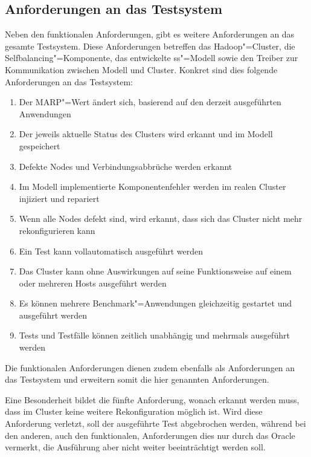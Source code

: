 \subsection{Anforderungen an das Testsystem}
\label{subsec:testRequirements}

Neben den funktionalen Anforderungen, gibt es weitere Anforderungen an das gesamte Testsystem.
Diese Anforderungen betreffen das Hadoop"=Cluster, die Selfbalancing"=Komponente, das entwickelte \gls{ss}"=Modell sowie den Treiber zur Kommunikation zwischen Modell und Cluster.
Konkret sind dies folgende Anforderungen an das Testsystem:

\begin{enumerate}
    \item Der \gls{MARP}"=Wert ändert sich, basierend auf den derzeit ausgeführten Anwendungen
    \item Der jeweils aktuelle Status des Clusters wird erkannt und im Modell gespeichert
    \item Defekte Nodes und Verbindungsabbrüche werden erkannt
    \item Im Modell implementierte Komponentenfehler werden im realen Cluster injiziert und repariert
    \item Wenn alle Nodes defekt sind, wird erkannt, dass sich das Cluster nicht mehr rekonfigurieren kann
    \item Ein Test kann vollautomatisch ausgeführt werden
    \item Das Cluster kann ohne Auswirkungen auf seine Funktionsweise auf einem oder mehreren Hosts ausgeführt werden
    \item Es können mehrere Benchmark"=Anwendungen gleichzeitig gestartet und ausgeführt werden
    \item Tests und Testfälle können zeitlich unabhängig und mehrmals ausgeführt werden
\end{enumerate}

Die funktionalen Anforderungen dienen zudem ebenfalls als Anforderungen an das Testsystem und erweitern somit die hier genannten Anforderungen.

Eine Besonderheit bildet die fünfte Anforderung, wonach erkannt werden muss, dass im Cluster keine weitere Rekonfiguration möglich ist.
Wird diese Anforderung verletzt, soll der ausgeführte Test abgebrochen werden, während bei den anderen, auch den funktionalen, Anforderungen dies nur durch das Oracle vermerkt, die Ausführung aber nicht weiter beeinträchtigt werden soll.
